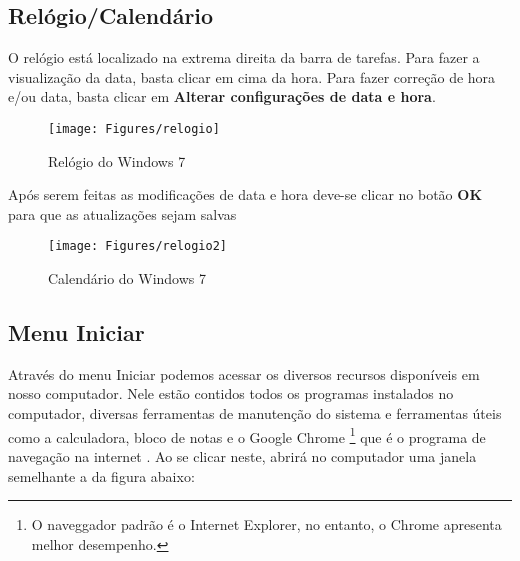 \documentclass[hidelinks,12pt]{article}
\begin{document}
	  \vspace{1cm}
	  \hspace{-0.6cm}{\small Iniciar } \hspace{1cm}{\tiny Barra de Inicialização Rápida e Janelas Ativas e Inativas}
	  \hspace{1.2cm}{\small Área de Notificação}
	  \newpage
  
  \subsection{Relógio/Calendário}
	
	O relógio está localizado na extrema direita da barra de tarefas. Para fazer a visualização da data, basta clicar em cima da hora. Para fazer correção de hora e/ou data, basta clicar em {\bf Alterar configurações de data e hora}. 
	
	\begin{figure}[!hb]
		\centering
		\texttt{[image: Figures/relogio]}
		\caption{Relógio do Windows 7}
		\label{fig:relogio}
		
	\end{figure}
	
	Após serem feitas as modificações de data e hora deve-se clicar no botão {\bf OK} para que as atualizações sejam salvas
	
	\begin{figure}[!h]
		\centering
		\texttt{[image: Figures/relogio2]}
		\caption{Calendário do Windows 7}
		\label{fig:calendario}
		
	\end{figure}
	
	\newpage
	\subsection{Menu Iniciar}
	
	Através do menu Iniciar podemos acessar os diversos recursos disponíveis em nosso computador. Nele estão contidos todos os programas instalados no computador, diversas ferramentas de manutenção do sistema e ferramentas úteis como a calculadora, bloco de notas e o Google Chrome \footnote{O naveggador padrão é o Internet Explorer, no entanto, o Chrome apresenta melhor desempenho.} que é o programa de navegação na internet . Ao se clicar neste, abrirá no computador uma janela semelhante a da figura abaixo:
	
\end{document}
